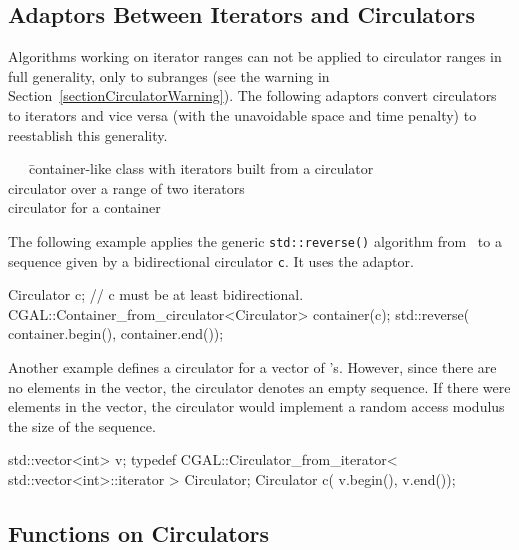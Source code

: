 \subsection{Adaptors Between Iterators and Circulators}
\label{sectionCirculatorAdaptor}

Algorithms working on iterator ranges can not be applied to circulator
ranges in full generality, only to subranges (see the warning in
Section~\ref{sectionCirculatorWarning}). The following adaptors
convert circulators to iterators and vice versa (with the unavoidable
space and time penalty) to reestablish this generality.


\begin{tabbing}
  \ \ \ \=
      container-like class with iterators built from a circulator\\
    \>
      circulator over a range of two iterators\\
   \>
      circulator for a container
\end{tabbing}

The following example applies the generic {\tt std::reverse()} algorithm 
from \stl\ to a sequence given by a bidirectional circulator {\tt c}.
It uses the  adaptor.

\begin{ccExampleCode}
Circulator c;  // c must be at least bidirectional.
CGAL::Container_from_circulator<Circulator> container(c);
std::reverse( container.begin(), container.end());
\end{ccExampleCode}

Another example defines a circulator  for a vector of
's. However, since there are no elements in the vector, the
circulator denotes an empty sequence.  If there were elements in the
vector, the circulator would implement a random access modulus the
size of the sequence.

\begin{ccExampleCode}
std::vector<int> v;
typedef  CGAL::Circulator_from_iterator< 
             std::vector<int>::iterator > Circulator;
Circulator c( v.begin(), v.end());
\end{ccExampleCode}

\subsection{Functions on Circulators}
\label{sectionCirculatorFunctions}

